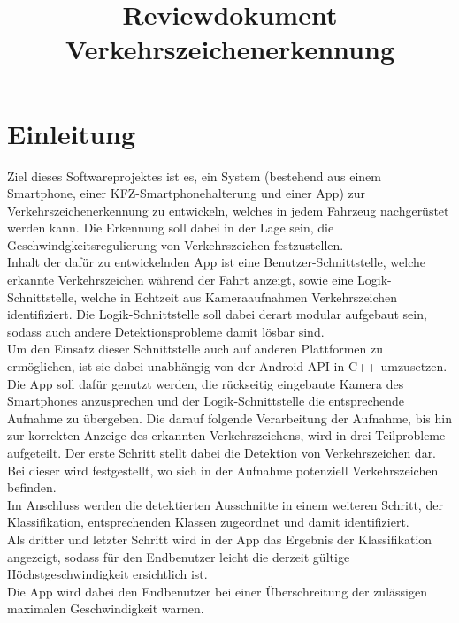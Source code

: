 \documentclass[12pt,a4paper,ngerman,enabledeprecatedfontcommands]{scrreprt}
\title{Reviewdokument\\Verkehrszeichenerkennung}
\begin{document}
\maketitle

\renewcommand{\arraystretch}{1.5}

%

\tableofcontents

\chapter*{Einleitung}
Ziel dieses Softwareprojektes ist es, ein \gls{System} (bestehend aus einem \gls{Smartphone}, einer KFZ-Smartphonehalterung und einer \gls{App}) zur Verkehrszeichenerkennung zu entwickeln, welches in jedem \gls{Fahrzeug} nachgerüstet werden kann. Die Erkennung soll dabei in der Lage sein, die Geschwindgkeitsregulierung von Verkehrszeichen festzustellen.\\

Inhalt der dafür zu entwickelnden \gls{App} ist eine Benutzer-Schnittstelle, welche erkannte Verkehrszeichen während der Fahrt anzeigt, sowie eine Logik-Schnittstelle, welche in Echtzeit aus Kameraaufnahmen Verkehrszeichen identifiziert. Die Logik-Schnittstelle soll dabei derart modular aufgebaut sein, sodass auch andere Detektionsprobleme damit lösbar sind.\\

Um den Einsatz dieser Schnittstelle auch auf anderen Plattformen zu ermöglichen, ist sie dabei unabhängig von der Android API in C++ umzusetzen.\\

Die App soll dafür genutzt werden, die rückseitig eingebaute Kamera des Smartphones anzusprechen und der Logik-Schnittstelle die entsprechende Aufnahme zu übergeben.
Die darauf folgende Verarbeitung der Aufnahme, bis hin zur korrekten Anzeige des erkannten Verkehrszeichens, wird in drei Teilprobleme aufgeteilt.
Der erste Schritt stellt dabei die Detektion von Verkehrszeichen dar. Bei dieser wird festgestellt, wo sich in der Aufnahme potenziell Verkehrszeichen befinden.\\
Im Anschluss werden die detektierten Ausschnitte in einem weiteren Schritt, der Klassifikation, entsprechenden Klassen zugeordnet und damit identifiziert.\\
Als dritter und letzter Schritt wird in der App das Ergebnis der Klassifikation angezeigt, sodass für den Endbenutzer leicht die derzeit gültige Höchstgeschwindigkeit ersichtlich ist.\\
Die App wird dabei den Endbenutzer bei einer Überschreitung der zulässigen maximalen Geschwindigkeit warnen.\\
\end{document}
